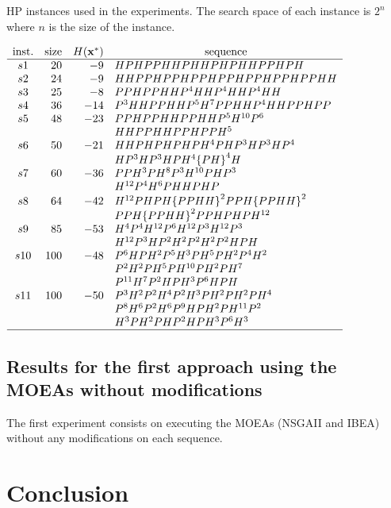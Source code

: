 \begin{table}[htbp]
	\begin{center}
		\caption{HP instances used in the experiments. The search space of each instance is $2^n$ where $n$ is the size of
			the instance.}
		\label{tab:instances}
		{$\begin{array}{c r r l}
			\text{inst.} & \text{size} &  \multicolumn{1}{ c }{H({\bf{x}}^*)} & \multicolumn{1}{c}{\text{sequence}} \\ \hline
			s1 &20 &-9 & HPHPPHHPHHPHPHHPPHPH \\
			s2 &24 &-9 & HHPPHPPHPPHPPHPPHPPHPPHH \\
			s3 &25 &-8 & PPHPPHHP^4HHP^4HHP^4HH \\
			s4 &36 &-14 &  P^3HHPPHHP^5H^7PPHHP^4HHPPHPP\\
			s5 &48 &-23 &  PPHPPHHPPHHP^5H^{10}P^6 \\
			&   &    &  HHPPHHPPHPPH^5 \\
			s6 &50 &-21 &  HHPHPHPHPH^4PHP^3HP^3HP^4 \\
			&   &    & HP^3HP^3HPH^4{\{PH\}}^4H\\
			s7 &60 &-36 &  PPH^3PH^8P^3H^{10}PHP^3\\
			&   &    &  H^{12}P^4H^6PHHPHP\\
			s8 &64 &-42 &   H^{12}PHPH{\{PPHH\}}^2PPH{\{PPHH\}}^2\\
			&   &    &  PPH{\{PPHH\}}^2PPHPHPH^{12}\\
			s9  &85   &-53  & H^4P^4H^{12}P^6 H^{12} P^3 H^{12} P^3 \\
			&   &    &    H^{12} P^3  H P^2 H^2    P^2 H^2  P^2 H P H  \\
			s10  &100  &-48  &  P^6HPH^{2}P^5H^{3}PH^5PH^{2} P^4 H^{2} \\
			&   &    &   P^2  H^2 P  H^5  P H^{10} P H^{2} P H^{7}  \\
			&   &    &  P^{11} H^{7} P^2  H P   H^3  P^{6} H P H \\
			s11 &100  &-50  &  P^3H^{2}P^2H^{4}P^2H^{3}PH^{2} PH^{2}PH^{4} \\
			&   &    & P^8 H^6 P^{2} H^{6} P^{9} H P H^{2} P  H^{11} P^2  \\
			&   &    &H^3 P  H^{2} P H P^2  H P H^3 P^6 H^3\\ \hline
			\end{array}$}
	\end{center}
\end{table}

\subsection{Results for the first approach using the MOEAs without modifications}

The first experiment consists on executing the MOEAs (NSGAII and IBEA) without any modifications on each sequence.

\section{Conclusion}